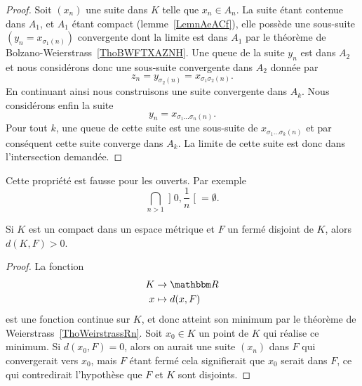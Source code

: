 \begin{proof}
    Soit \( (x_n)\) une suite dans \( K\) telle que \( x_n\in A_n\). La suite étant contenue dans \( A_1\), et \( A_1\) étant compact (lemme~\ref{LemnAeACf}), elle possède une sous-suite \( (y_n=x_{\sigma_1(n)})\) convergente dont la limite est dans \( A_1\) par le théorème de Bolzano-Weierstrass~\ref{ThoBWFTXAZNH}. Une queue de la suite \( y_n\) est dans \( A_2\) et nous considérons donc une sous-suite convergente dans \( A_2\) donnée par
    \begin{equation}
        z_n=y_{\sigma_2(n)}=x_{\sigma_1\sigma_2(n)}.
    \end{equation}
    En continuant ainsi nous construisons une suite convergente dans \( A_k\). Nous considérons enfin la suite
    \begin{equation}
        y_n=x_{\sigma_1\ldots \sigma_n(n)}.
    \end{equation}
    Pour tout \( k\), une queue de cette suite est une sous-suite de \( x_{\sigma_1\ldots \sigma_k(n)}\) et par conséquent cette suite converge dans \( A_k\). La limite de cette suite est donc dans l'intersection demandée.
\end{proof}

\begin{remark}
    Cette propriété est fausse pour les ouverts. Par exemple
    \begin{equation}
        \bigcap_{n>1}\mathopen] 0 , \frac{1}{ n } \mathclose[=\emptyset.
    \end{equation}
\end{remark}

\begin{lemma}   \label{LemKIcAbic}
    Si \( K\) est un compact dans un espace métrique et \( F\) un fermé disjoint de \( K\), alors \( d(K,F)>0\).
\end{lemma}

\begin{proof}
    La fonction
    \begin{equation}
        \begin{aligned}
             K&\to \eR \\
            x&\mapsto d(x,F)
        \end{aligned}
    \end{equation}
    est une fonction continue sur \( K\), et donc atteint son minimum par le théorème de Weierstrass~\ref{ThoWeirstrassRn}. Soit \( x_0\in K\) un point de \( K\) qui réalise ce minimum. Si \( d(x_0,F)=0\), alors on aurait une suite \( (x_n)\) dans \( F\) qui convergerait vers \( x_0\), mais \( F\) étant fermé cela signifierait que \( x_0\) serait dans \( F\), ce qui contredirait l'hypothèse que \( F\) et \( K\) sont disjoints.
\end{proof}

